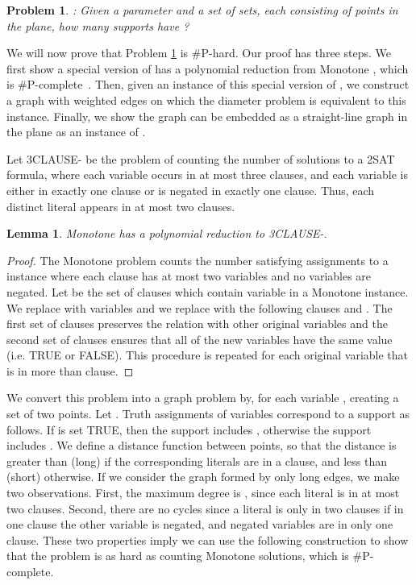 \documentclass{journal}
\newcommand{\pset}{support\xspace}
\newcommand{\psets}{supports\xspace}
\newcommand{\PDIAM}{\xspace}
\newcommand{\twoSAT}{\xspace}
\newtheorem {problem}[theorem]{Problem}
\newtheorem {lemma}[theorem]{Lemma}
\begin{document}
        \begin{problem}
        \PDIAM: 
        Given a parameter  and a set  of  sets, each consisting of  points in the plane, how many \psets  have ?
        \label{prb:count-diam}
        \end{problem}

We will now prove that Problem \ref{prb:count-diam} is \#P-hard.
Our proof has three steps. We first show a special version of \twoSAT has a polynomial reduction from Monotone \twoSAT, which is \#P-complete~\cite{Val79}.
Then, given an instance of this special version of \twoSAT, we construct a graph with weighted edges on which the diameter problem is equivalent to this \twoSAT instance.  Finally, we show the graph can be embedded as a straight-line graph in the plane as an instance of \PDIAM.

Let 3CLAUSE-\twoSAT be the problem of counting the number of solutions to a 2SAT formula, where each variable occurs in at most three clauses, and each variable is either in exactly one clause or is negated in exactly one clause.  Thus, each distinct literal appears in at most two clauses.  

\begin {lemma}
\label{lem:3CLAUSE-2SAT}
Monotone \twoSAT has a polynomial reduction to 3CLAUSE-\twoSAT.
\end {lemma}
\begin{proof}
The Monotone \twoSAT problem counts the number satisfying assignments to a \twoSAT instance where each clause has at most two variables and no variables are negated.  
Let  be the set of  clauses which contain variable  in a Monotone \twoSAT instance.  We replace  with  variables  and we replace  with the following  clauses  and  .
The first set of clauses preserves the relation with other original variables and the second set of clauses ensures that all of the new variables have the same value (i.e. \textsf{TRUE} or \textsf{FALSE}).
This procedure is repeated for each original variable that is in more than  clause.
\end{proof}

We convert this problem into a graph problem by, for each variable , creating a set  of two points.  Let .  Truth assignments of variables correspond to a \pset as follows.  If  is set \textsf{TRUE}, then the \pset includes , otherwise the \pset includes .  We define a distance function  between points, so that the distance is greater than  (long) if the corresponding literals are in a clause, and less than  (short) otherwise.  If we consider the graph formed by only long edges, we make two observations.
First, the maximum degree is , since each literal is in at most two clauses.
Second, there are no cycles since a literal is only in two clauses if in one clause the other variable is negated, and negated variables are in only one clause.
These two properties imply we can use the following construction to show that the \PDIAM problem is as hard as counting Monotone \twoSAT solutions, which is \#P-complete.
\end{document}
